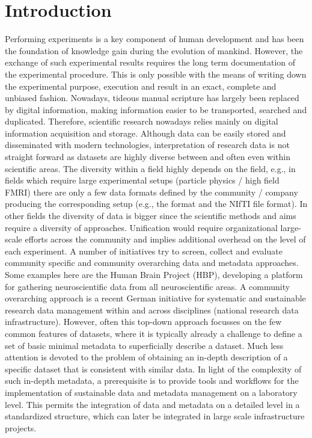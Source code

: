 \clearpage
\chapter{Introduction}
\label{sec:intro}

Performing experiments is a key component of human development and has been the foundation of knowledge gain during the evolution of mankind. However, the exchange of such experimental results requires the long term documentation of the  experimental procedure. This is only possible with the means of writing down the experimental purpose, execution and result in an exact, complete and unbiased fashion. Nowadays, tideous manual scripture has largely been replaced by digital information, making information easier to be transported, searched and duplicated. Therefore, scientific research nowadays relies mainly on digital information acquisition and storage. Although data can be easily stored and disseminated with modern technologies, interpretation of research data is not straight forward as datasets are highly diverse between and often even within scientific areas. The diversity within a field highly depends on the field, e.g., in fields which require large experimental setups (particle physics / high field FMRI) there are only a few data formats defined by the community / company producing the corresponding setup (e.g., the  format \citep{Brun_1996} and the NIfTI file format). In other fields the diversity of data is bigger since the scientific methods and aims require a diversity of approaches. Unification would require organizational large-scale efforts across the community and implies additional overhead on the level of each experiment. A number of initiatives try to screen, collect and evaluate community specific and community overarching data and metadata approaches. Some examples here are the Human Brain Project (HBP), developing a platform for gathering neuroscientific data from all neuroscientific areas. A community overarching approach is a recent German initiative for systematic and sustainable research data management within and across disciplines (national research data infrastructure). However, often this top-down approach focusses on the few common features of datasets, where it is typically already a challenge to define a set of basic minimal metadata to superficially describe a dataset. Much less attention is devoted to the problem of obtaining an in-depth description of a specific dataset that is consistent with similar data. In light of the complexity of such in-depth metadata, a prerequisite is to provide tools and workflows for the implementation of sustainable data and metadata management on a laboratory level. This permits the integration of data and metadata on a detailed level in a standardized structure, which can later be integrated in large scale infrastructure projects.

